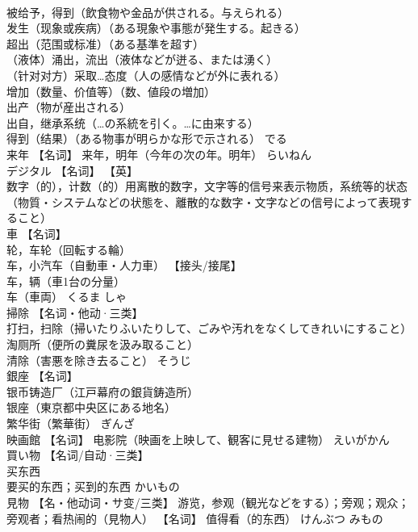 \documentclass[8pt]{extreport}
\begin{document}
\begin{CJK}{UTF8}{min}
\\	被给予，得到（飲食物や金品が供される。与えられる） 
\\	发生（现象或疾病）（ある現象や事態が発生する。起きる） 
\\	超出（范围或标准）（ある基準を超す） 
\\	（液体）涌出，流出（液体などが迸る、または湧く） 
\\	（针对对方）采取…态度（人の感情などが外に表れる） 
\\	增加（数量、价值等）（数、値段の増加） 
\\	出产（物が産出される） 
\\	出自，继承系统（…の系統を引く。…に由来する） 
\\	得到（结果）（ある物事が明らかな形で示される）	でる	
\\	来年	【名词】 来年，明年（今年の次の年。明年）	らいねん	
\\	デジタル	【名词】 【英】
\\	数字（的），计数（的）用离散的数字，文字等的信号来表示物质，系统等的状态（物質・システムなどの状態を、離散的な数字・文字などの信号によって表現すること）		
\\	車	【名词】 
\\	轮，车轮（回転する輪） 
\\	车，小汽车（自動車・人力車） 【接头/接尾】 
\\	车，辆（車1台の分量） 
\\	车（車両）	くるま しゃ	
\\	掃除	【名词・他动·三类】 
\\	打扫，扫除（掃いたりふいたりして、ごみや汚れをなくしてきれいにすること） 
\\	淘厕所（便所の糞尿を汲み取ること） 
\\	清除（害悪を除き去ること）	そうじ	
\\	銀座	【名词】 
\\	银币铸造厂（江戸幕府の銀貨鋳造所） 
\\	银座（東京都中央区にある地名） 
\\	繁华街（繁華街）	ぎんざ	
\\	映画館	【名词】 电影院（映画を上映して、観客に見せる建物）	えいがかん	
\\	買い物	【名词/自动·三类】 
\\	买东西 
\\	要买的东西；买到的东西	かいもの	
\\	見物	【名・他动词・サ变/三类】 游览，参观（観光などをする）；旁观；观众；旁观者；看热闹的（見物人） 【名词】 值得看（的东西）	けんぶつ みもの	

\end{CJK}
\end{document}
